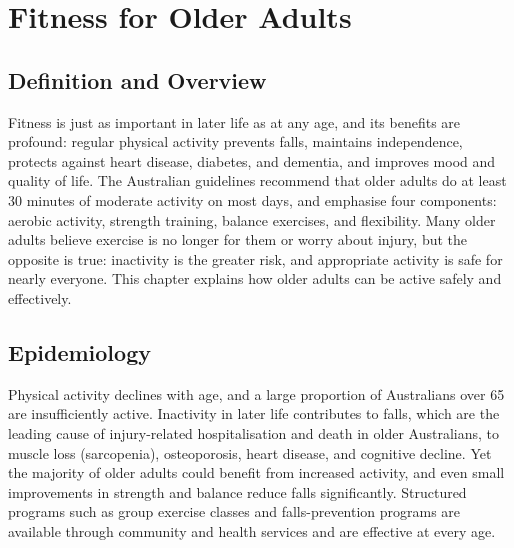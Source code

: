 \chapter{Fitness for Older Adults}

\section*{Definition and Overview}
Fitness is just as important in later life as at any age, and its benefits are profound: regular physical activity prevents falls, maintains independence, protects against heart disease, diabetes, and dementia, and improves mood and quality of life. The Australian guidelines recommend that older adults do at least 30 minutes of moderate activity on most days, and emphasise four components: aerobic activity, strength training, balance exercises, and flexibility. Many older adults believe exercise is no longer for them or worry about injury, but the opposite is true: inactivity is the greater risk, and appropriate activity is safe for nearly everyone. This chapter explains how older adults can be active safely and effectively.

\section*{Epidemiology}
Physical activity declines with age, and a large proportion of Australians over 65 are insufficiently active. Inactivity in later life contributes to falls, which are the leading cause of injury-related hospitalisation and death in older Australians, to muscle loss (sarcopenia), osteoporosis, heart disease, and cognitive decline. Yet the majority of older adults could benefit from increased activity, and even small improvements in strength and balance reduce falls significantly. Structured programs such as group exercise classes and falls-prevention programs are available through community and health services and are effective at every age.

